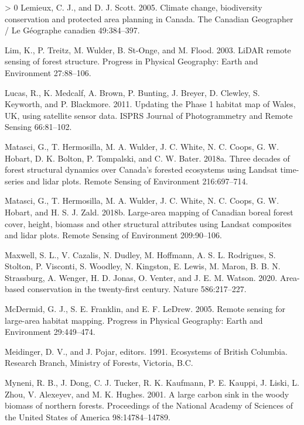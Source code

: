 \documentclass[11pt]{article}
\newlength{\cslhangindent}
\newenvironment{CSLReferences}[3] %
 {%
  \setlength{\parindent}{0pt}
  \ifodd #1 \everypar{\setlength{\hangindent}{\cslhangindent}}\ignorespaces\fi
  \ifnum #2 > 0
  \setlength{\parskip}{#2\baselineskip}
  \fi
 }%
 {}
\begin{document}
\begin{CSLReferences}{1}{0}
\leavevmode\hypertarget{ref-lemieux2005}{}%
Lemieux, C. J., and D. J. Scott. 2005. Climate change, biodiversity
conservation and protected area planning in Canada. The Canadian
Geographer / Le Géographe canadien 49:384--397.

\leavevmode\hypertarget{ref-lim2003}{}%
Lim, K., P. Treitz, M. Wulder, B. St-Onge, and M. Flood. 2003. LiDAR
remote sensing of forest structure. Progress in Physical Geography:
Earth and Environment 27:88--106.

\leavevmode\hypertarget{ref-lucas2011}{}%
Lucas, R., K. Medcalf, A. Brown, P. Bunting, J. Breyer, D. Clewley, S.
Keyworth, and P. Blackmore. 2011. Updating the Phase 1 habitat map of
Wales, UK, using satellite sensor data. ISPRS Journal of Photogrammetry
and Remote Sensing 66:81--102.

\leavevmode\hypertarget{ref-matasciThreeDecadesForest2018}{}%
Matasci, G., T. Hermosilla, M. A. Wulder, J. C. White, N. C. Coops, G.
W. Hobart, D. K. Bolton, P. Tompalski, and C. W. Bater. 2018a. Three
decades of forest structural dynamics over Canada's forested ecosystems
using Landsat time-series and lidar plots. Remote Sensing of Environment
216:697--714.

\leavevmode\hypertarget{ref-matasciLargeareaMappingCanadian2018}{}%
Matasci, G., T. Hermosilla, M. A. Wulder, J. C. White, N. C. Coops, G.
W. Hobart, and H. S. J. Zald. 2018b. Large-area mapping of Canadian
boreal forest cover, height, biomass and other structural attributes
using Landsat composites and lidar plots. Remote Sensing of Environment
209:90--106.

\leavevmode\hypertarget{ref-maxwell2020}{}%
Maxwell, S. L., V. Cazalis, N. Dudley, M. Hoffmann, A. S. L. Rodrigues,
S. Stolton, P. Visconti, S. Woodley, N. Kingston, E. Lewis, M. Maron, B.
B. N. Strassburg, A. Wenger, H. D. Jonas, O. Venter, and J. E. M.
Watson. 2020. Area-based conservation in the twenty-first century.
Nature 586:217--227.

\leavevmode\hypertarget{ref-mcdermid2005}{}%
McDermid, G. J., S. E. Franklin, and E. F. LeDrew. 2005. Remote sensing
for large-area habitat mapping. Progress in Physical Geography: Earth
and Environment 29:449--474.

\leavevmode\hypertarget{ref-meidingerEcosystemsBritishColumbia1991}{}%
Meidinger, D. V., and J. Pojar, editors. 1991. Ecosystems of British
Columbia. Research Branch, Ministry of Forests, Victoria, B.C.

\leavevmode\hypertarget{ref-myneni2001}{}%
Myneni, R. B., J. Dong, C. J. Tucker, R. K. Kaufmann, P. E. Kauppi, J.
Liski, L. Zhou, V. Alexeyev, and M. K. Hughes. 2001. A large carbon sink
in the woody biomass of northern forests. Proceedings of the National
Academy of Sciences of the United States of America 98:14784--14789.


\end{CSLReferences}
\end{document}
